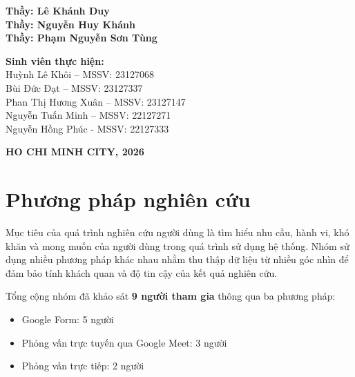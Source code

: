 \documentclass[a4paper,12pt]{article}
\begin{document}
\begin{titlepage}
\begin{center}
    
    \vspace{1.5cm}

    \begin{tcolorbox}[colback=blue!5!white, colframe=blue!50!black, width=0.9\textwidth, boxrule=0.8pt, arc=3pt, left=8pt, right=8pt]
        \textbf{Thầy: Lê Khánh Duy}\\
        \textbf{Thầy: Nguyễn Huy Khánh}\\
        \textbf{Thầy: Phạm Nguyễn Sơn Tùng}
    \end{tcolorbox}
    \vspace{1cm}

    \begin{tcolorbox}[colback=gray!10!white, colframe=gray!60!black, width=0.9\textwidth, boxrule=0.8pt, arc=3pt, left=8pt, right=8pt]
        \textbf{Sinh viên thực hiện:} \\
        Huỳnh Lê Khôi -- MSSV: 23127068 \\ 
        Bùi Đức Đạt -- MSSV: 23127337 \\
        Phan Thị Hương Xuân -- MSSV: 23127147 \\
        Nguyễn Tuấn Minh -- MSSV: 22127271 \\
        Nguyễn Hồng Phúc - MSSV: 22127333
        
    \end{tcolorbox}

    \vfill
    {\large\textbf{HO CHI MINH CITY, 2026}}
\end{center}
\end{titlepage}
\newpage
\section*{Phương pháp nghiên cứu}
Mục tiêu của quá trình nghiên cứu người dùng là tìm hiểu nhu cầu, hành vi, khó khăn và mong muốn của người dùng trong quá trình sử dụng hệ thống. Nhóm sử dụng nhiều phương pháp khác nhau nhằm thu thập dữ liệu từ nhiều góc nhìn để đảm bảo tính khách quan và độ tin cậy của kết quả nghiên cứu.

Tổng cộng nhóm đã khảo sát \textbf{9 người tham gia} thông qua ba phương pháp:

\begin{itemize}
    \item Google Form: 5 người
    \item Phỏng vấn trực tuyến qua Google Meet: 3 người
    \item Phỏng vấn trực tiếp: 2 người
\end{itemize}
\end{document}
